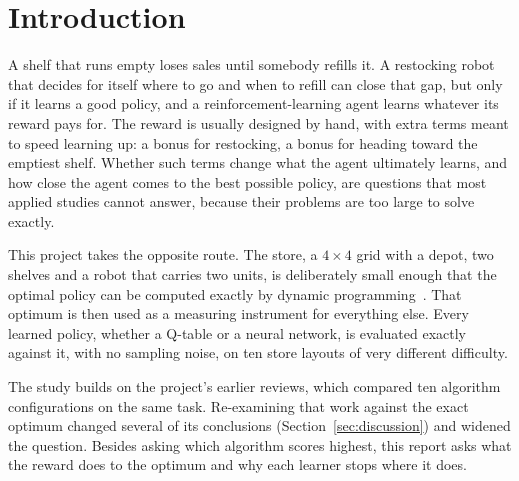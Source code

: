 \section{Introduction}
\label{sec:intro}

A shelf that runs empty loses sales until somebody refills it. A restocking robot that decides for itself where to go and when to refill can close that gap, but only if it learns a good policy, and a reinforcement-learning agent learns whatever its reward pays for. The reward is usually designed by hand, with extra terms meant to speed learning up: a bonus for restocking, a bonus for heading toward the emptiest shelf. Whether such terms change what the agent ultimately learns, and how close the agent comes to the best possible policy, are questions that most applied studies cannot answer, because their problems are too large to solve exactly.

This project takes the opposite route. The store, a $4\times4$ grid with a depot, two shelves and a robot that carries two units, is deliberately small enough that the optimal policy can be computed exactly by dynamic programming~\cite{bellman1957,howard1960,puterman1994}. That optimum is then used as a measuring instrument for everything else. Every learned policy, whether a Q-table or a neural network, is evaluated exactly against it, with no sampling noise, on ten store layouts of very different difficulty.

The study builds on the project's earlier reviews, which compared ten algorithm configurations on the same task. Re-examining that work against the exact optimum changed several of its conclusions (Section~\ref{sec:discussion}) and widened the question. Besides asking which algorithm scores highest, this report asks what the reward does to the optimum and why each learner stops where it does.

